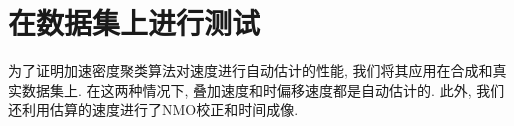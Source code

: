 \section{在数据集上进行测试}
为了证明加速密度聚类算法对速度进行自动估计的性能, 我们将其应用在合成和真实数据集上. 在这两种情况下, 叠加速度和时偏移速度都是自动估计的. 此外, 我们还利用估算的速度进行了NMO校正和时间成像. 